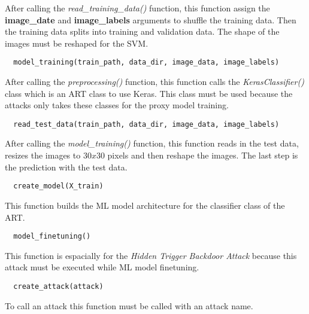 \noindent After calling the \textit{read\_training\_data()} function, this function assign the \textbf{image\_date} and \textbf{image\_labels} arguments to shuffle the training data. Then the training data splits into training and validation data. The shape of the images must be reshaped for the SVM.

\begin{lstlisting}
  model_training(train_path, data_dir, image_data, image_labels)
\end{lstlisting}

\noindent After calling the \textit{preprocessing()} function, this function calls the \textit{KerasClassifier()} class which is an ART class to use Keras. This class must be used because the attacks only takes these classes for the proxy model training.

\begin{lstlisting}
  read_test_data(train_path, data_dir, image_data, image_labels)
\end{lstlisting}

\noindent After calling the \textit{model\_training()} function, this function reads in the test data, resizes the images to $30x30$ pixels and then reshape the images. The last step is the prediction with the test data.

\begin{lstlisting}
  create_model(X_train)
\end{lstlisting}

\noindent This function builds the ML model architecture for the classifier class of the ART.

\begin{lstlisting}
  model_finetuning()
\end{lstlisting}

\noindent This function is espacially for the \textit{Hidden Trigger Backdoor Attack} because this attack must be executed while ML model finetuning.

\begin{lstlisting}
  create_attack(attack)
\end{lstlisting}

\noindent To call an attack this function must be called with an attack name.
